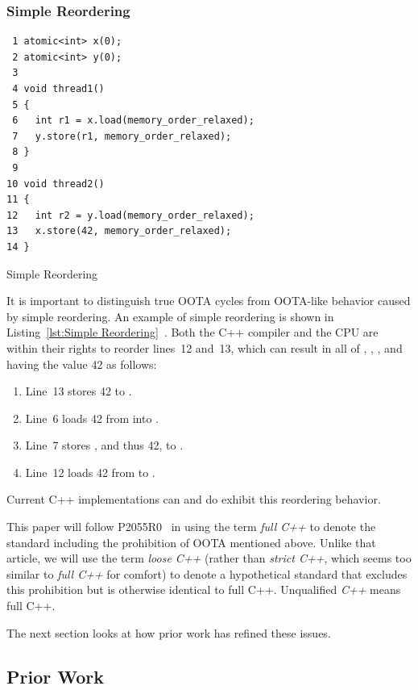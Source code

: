\documentclass[10]{article}
\begin{document}
\subsubsection{Simple Reordering}
\label{sec:Simple Reordering}

\begin{listing}[tbp]
\begin{verbatim}
 1 atomic<int> x(0);
 2 atomic<int> y(0);
 3
 4 void thread1()
 5 {
 6   int r1 = x.load(memory_order_relaxed);
 7   y.store(r1, memory_order_relaxed);
 8 }
 9
10 void thread2()
11 {
12   int r2 = y.load(memory_order_relaxed);
13   x.store(42, memory_order_relaxed);
14 }
\end{verbatim}
\caption{Simple Reordering}
\label{lst:Simple Reordering}
\end{listing}

It is important to distinguish true OOTA cycles from OOTA-like
behavior caused by simple reordering.
An example of simple reordering is shown in
Listing~\ref{lst:Simple Reordering}~\cite{PaulEMcKenney2020RelaxedGuideRelaxed}.
Both the C++ compiler and the CPU are within their rights to reorder
lines~12 and~13, which can result in all of , , ,
and  having the value 42 as follows:
\begin{enumerate}
\item   Line~13 stores 42 to .
\item   Line~6 loads 42 from  into .
\item   Line~7 stores , and thus 42, to .
\item   Line~12 loads 42 from  to .
\end{enumerate}
Current C++ implementations can and do exhibit this reordering behavior.

\medskip

This paper will follow P2055R0~\cite{PaulEMcKenney2020RelaxedGuideRelaxed}
in using the term \emph{full C++} to denote the standard including the
prohibition of OOTA mentioned above.
Unlike that article, we will use the term \emph{loose C++}
(rather than \emph{strict C++}, which seems too similar to
\emph{full C++} for comfort)
to denote a hypothetical standard that excludes this prohibition but
is otherwise identical to full C++.
Unqualified \emph{C++} means full C++.

The next section looks at how prior work has refined these issues.

\subsection{Prior Work}
\label{sec:Prior Work}
\end{document}
